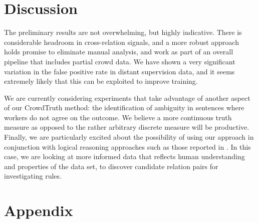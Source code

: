\begin{table}[htb!]
\caption{Precision \& Recall at 20,000 training steps.}
\label{tab:cnn_res}
\centering
{}
\end{table}

\section{Discussion}

The preliminary results are not overwhelming, but highly indicative.  There is considerable headroom in cross-relation signals, and a more robust approach holds promise to eliminate manual analysis, and work as part of an overall pipeline that includes partial crowd data. We have shown a very significant variation in the false positive rate in distant supervision data, and it seems extremely likely that this can be exploited to improve training.

We are currently considering experiments that take advantage of another aspect of our CrowdTruth method: the identification of ambiguity in sentences where workers do not agree on the outcome.  We believe a more continuous truth measure as opposed to the rather arbitrary discrete measure will be productive. Finally, we are particularly excited about the possibility of using our approach in conjunction with logical reasoning approaches such as those reported in \cite{demeester2016regularizing}.  In this case, we are looking at more informed data that reflects human understanding and properties of the data set, to discover candidate relation pairs for investigating rules.

\section*{Appendix}
\label{sec:appendix4.1}

